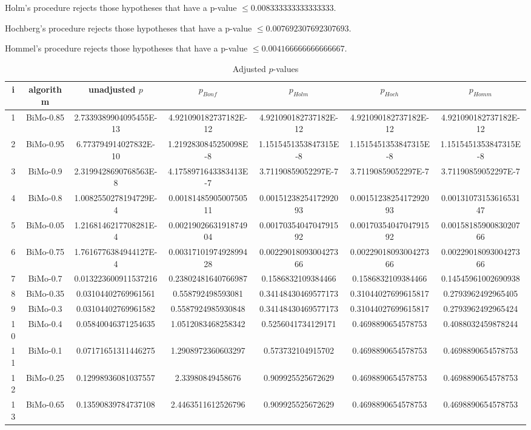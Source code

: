 \documentclass[a4paper,10pt]{article}
\begin{document}
\begin{landscape}
Holm's procedure rejects those hypotheses that have a p-value $\le0.008333333333333333$.


Hochberg's procedure rejects those hypotheses that have a p-value $\le0.007692307692307693$.


Hommel's procedure rejects those hypotheses that have a p-value $\le0.004166666666666667$.


\begin{table}[!htp]
\centering\tiny
\caption{Adjusted $p$-values}
\begin{tabular}{ccccccc}
i&algorithm&unadjusted $p$&$p_{Bonf}$&$p_{Holm}$&$p_{Hoch}$&$p_{Homm}$\\
\hline
1&BiMo-0.85&2.7339389904095455E-13&4.921090182737182E-12&4.921090182737182E-12&4.921090182737182E-12&4.921090182737182E-12\\
2&BiMo-0.95&6.773794914027832E-10&1.2192830845250098E-8&1.1515451353847315E-8&1.1515451353847315E-8&1.1515451353847315E-8\\
3&BiMo-0.9&2.3199428690768563E-8&4.1758971643383413E-7&3.71190859052297E-7&3.71190859052297E-7&3.71190859052297E-7\\
4&BiMo-0.8&1.0082550278194729E-4&0.0018148590500750511&0.0015123825417292093&0.0015123825417292093&0.0013107315361653147\\
5&BiMo-0.05&1.2168146217708281E-4&0.0021902663191874904&0.0017035404704791592&0.0017035404704791592&0.0015818590083020766\\
6&BiMo-0.75&1.7616776384944127E-4&0.0031710197492899428&0.0022901809300427366&0.0022901809300427366&0.0022901809300427366\\
7&BiMo-0.7&0.013223600911537216&0.23802481640766987&0.1586832109384466&0.1586832109384466&0.14545961002690938\\
8&BiMo-0.35&0.03104402769961561&0.558792498593081&0.34148430469577173&0.31044027699615817&0.2793962492965405\\
9&BiMo-0.3&0.03104402769961582&0.5587924985930848&0.34148430469577173&0.31044027699615817&0.2793962492965424\\
10&BiMo-0.4&0.05840046371254635&1.0512083468258342&0.5256041734129171&0.4698890654578753&0.4088032459878244\\
11&BiMo-0.1&0.07171651311446275&1.2908972360603297&0.573732104915702&0.4698890654578753&0.4698890654578753\\
12&BiMo-0.25&0.12998936081037557&2.33980849458676&0.909925525672629&0.4698890654578753&0.4698890654578753\\
13&BiMo-0.65&0.13590839784737108&2.4463511612526796&0.909925525672629&0.4698890654578753&0.4698890654578753\\

\end{tabular}
\end{table}
\end{landscape}
\end{document}
